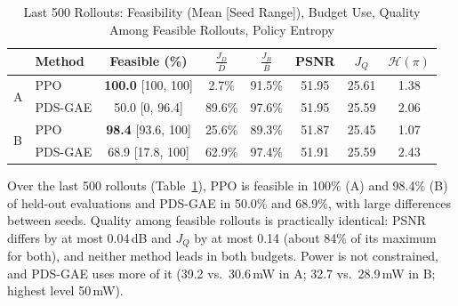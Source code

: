 \documentclass[conference]{IEEEtran}
\begin{document}
\begin{table}[t]
\caption{Last 500 Rollouts: Feasibility (Mean [Seed Range]), Budget Use, Quality Among Feasible Rollouts, Policy Entropy}
\label{tab:tail}
\centering
\footnotesize
\setlength{\tabcolsep}{2.4pt}
\begin{tabular}{@{}llcccccc@{}}
\toprule
 & Method & Feasible (\%) & $\frac{J_D}{\bar D}$ & $\frac{J_B}{\bar B}$ & PSNR & $J_Q$ & $\mathcal{H}(\pi)$\\
\midrule
\multirow{2}{*}{A} & PPO     & \textbf{100.0} [100, 100] & 2.7\%  & 91.5\% & 51.95 & 25.61 & 1.38\\
                   & PDS-GAE & 50.0 [0, 96.4]            & 89.6\% & 97.6\% & 51.95 & 25.59 & 2.06\\
\midrule
\multirow{2}{*}{B} & PPO     & \textbf{98.4} [93.6, 100] & 25.6\% & 89.3\% & 51.87 & 25.45 & 1.07\\
                   & PDS-GAE & 68.9 [17.8, 100]          & 62.9\% & 97.4\% & 51.91 & 25.59 & 2.43\\
\bottomrule
\end{tabular}
\end{table}

Over the last 500 rollouts (Table~\ref{tab:tail}), PPO is feasible in 100\% (A) and 98.4\% (B) of held-out evaluations and PDS-GAE in 50.0\% and 68.9\%, with large differences between seeds. Quality among feasible rollouts is practically identical: PSNR differs by at most 0.04\,dB and $J_Q$ by at most 0.14 (about 84\% of its maximum for both), and neither method leads in both budgets. Power is not constrained, and PDS-GAE uses more of it (39.2 vs.\ 30.6\,mW in A; 32.7 vs.\ 28.9\,mW in B; highest level 50\,mW).
\end{document}
